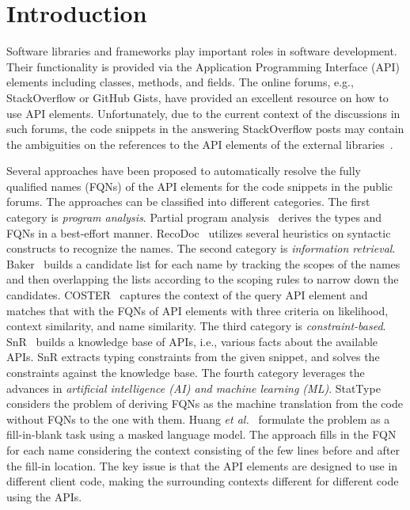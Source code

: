 \section{Introduction}
\label{sec:intro}

Software libraries and frameworks play important roles in software
development. Their functionality is provided via the Application
Programming Interface (API) elements including classes, methods, and
fields. The online forums, e.g., StackOverflow or GitHub Gists, have
provided an excellent resource on how to use API
elements. Unfortunately, due to the current context of the discussions
in such forums, the code snippets in the answering StackOverflow posts
may contain the ambiguities on the references to the API elements of
the external libraries~\cite{liveapi14}.

Several approaches have been proposed to automatically resolve the
fully qualified names (FQNs) of the API elements for the code snippets
in the public forums.  The approaches can be classified into different
categories. The first category is {\em program analysis}. Partial
program analysis~\cite{dagenais-oopsla08} derives the types and FQNs
in a best-effort manner. RecoDoc~\cite{dagenais-icse12} utilizes
several heuristics on syntactic constructs to recognize the names.
The second category is {\em information
  retrieval}. Baker~\cite{liveapi14} builds a candidate list for each
name by tracking the scopes of the names and then overlapping the
lists according to the scoping rules to narrow down the candidates.
COSTER~\cite{coster-ase19} captures the context of the query API
element and matches that with the FQNs of API elements with three
criteria on likelihood, context similarity, and name similarity.  The
third category is {\em constraint-based}.  SnR~\cite{snr-icse22}
builds a knowledge base of APIs, i.e., various facts about the
available APIs.  SnR extracts typing constraints from the given
snippet, and solves the constraints against the knowledge base. The
fourth category leverages the advances in {\em artificial intelligence
  (AI) and machine learning (ML)}. StatType~\cite{icse18} considers
the problem of deriving FQNs as the machine translation from the code
without FQNs to the one with them. Huang {\em et
  al.}~\cite{prompt-ase22} formulate the problem as a fill-in-blank
task using a masked language model. The approach fills in the FQN for
each name considering the context consisting of the few lines before
and after the fill-in location.  The key issue is that the API
elements are designed to use in different client code, making the
surrounding contexts different for different code using the APIs.

